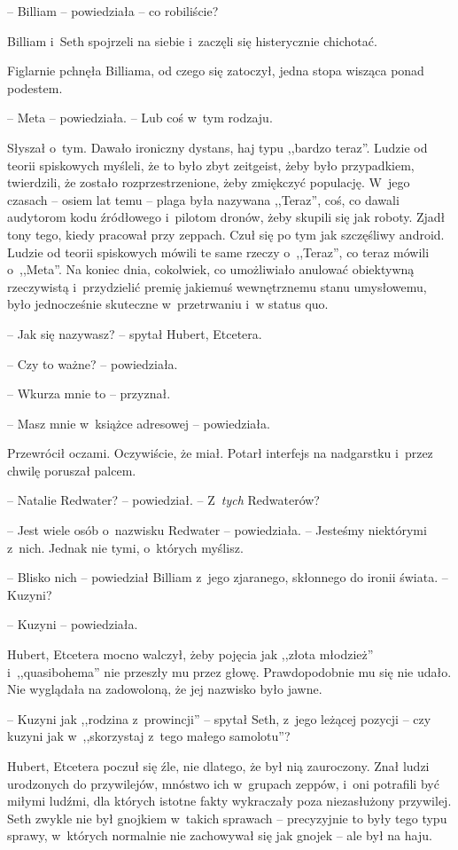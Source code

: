 \documentclass[oneside,polish,11pt,sfheadings]{mwbk}
\begin{document}
-- Billiam -- powiedziała -- co robiliście?

Billiam i~Seth spojrzeli na siebie i~zaczęli się histerycznie chichotać.

Figlarnie pchnęła Billiama, od czego się zatoczył, jedna stopa wisząca
ponad podestem.

-- Meta -- powiedziała. -- Lub coś w~tym rodzaju.

Słyszał o~tym. Dawało ironiczny dystans, haj typu ,,bardzo teraz''.
Ludzie od teorii spiskowych myśleli, że to było zbyt zeitgeist, żeby
było przypadkiem, twierdzili, że zostało rozprzestrzenione, żeby
zmiękczyć populację. W~jego czasach -- osiem lat temu -- plaga była
nazywana ,,Teraz'', coś, co dawali audytorom kodu źródłowego i~pilotom
dronów, żeby skupili się jak roboty. Zjadł tony tego, kiedy pracował
przy zeppach. Czuł się po tym jak szczęśliwy android. Ludzie od teorii
spiskowych mówili te same rzeczy o~,,Teraz'', co teraz mówili o~,,Meta''. Na koniec dnia, cokolwiek, co umożliwiało anulować obiektywną
rzeczywistą i~przydzielić premię jakiemuś wewnętrznemu stanu umysłowemu,
było jednocześnie skuteczne w~przetrwaniu i~w status quo.

-- Jak się nazywasz? -- spytał Hubert, Etcetera.

-- Czy to ważne? -- powiedziała.

-- Wkurza mnie to -- przyznał.

-- Masz mnie w~książce adresowej -- powiedziała.

Przewrócił oczami. Oczywiście, że miał. Potarł interfejs na nadgarstku i~przez chwilę poruszał palcem. 

-- Natalie Redwater? -- powiedział. -- Z~\textit{tych} Redwaterów?

-- Jest wiele osób o~nazwisku Redwater -- powiedziała. -- Jesteśmy
niektórymi z~nich. Jednak nie tymi, o~których myślisz.

-- Blisko nich -- powiedział Billiam z~jego zjaranego, skłonnego do ironii
świata. -- Kuzyni?

-- Kuzyni -- powiedziała.

Hubert, Etcetera mocno walczył, żeby pojęcia jak ,,złota młodzież'' i~,,quasibohema'' nie przeszły mu przez głowę. Prawdopodobnie mu się nie
udało. Nie wyglądała na zadowoloną, że jej nazwisko było jawne.

-- Kuzyni jak ,,rodzina z~prowincji'' -- spytał Seth, z~jego leżącej
pozycji -- czy kuzyni jak w~,,skorzystaj z~tego małego samolotu''?

Hubert, Etcetera poczuł się źle, nie dlatego, że był nią zauroczony.
Znał ludzi urodzonych do przywilejów, mnóstwo ich w~grupach zeppów, i~oni potrafili być miłymi ludźmi, dla których istotne fakty wykraczały
poza niezasłużony przywilej. Seth zwykle nie był gnojkiem w~takich
sprawach -- precyzyjnie to były tego typu sprawy, w~których normalnie nie
zachowywał się jak gnojek -- ale był na haju.
\end{document}
